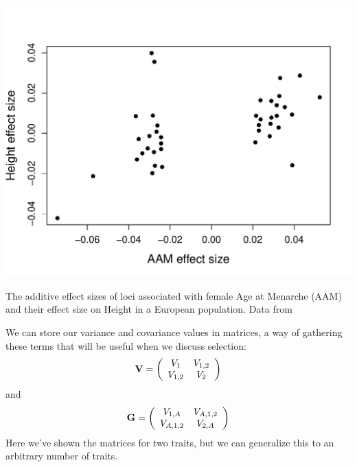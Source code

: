 \begin{marginfigure}
\begin{center}
\includegraphics[width= \textwidth]{Journal_figs/Quant_gen/pickrell_pleiotropy/AAM_height.pdf}
\end{center}
\caption{The additive effect sizes of loci associated with female Age at Menarche (AAM) and their effect size on Height in a European population. Data from \citet{pickrell2016detection}} \label{fig:AAM_height}   %
\end{marginfigure}

We can store our variance and covariance values in matrices, a way of gathering these terms that will be useful when we discuss selection: 
\begin{equation}
\bf{V}= \left( \begin{array}{cc} 
V_{1} & V_{1,2} \\
V_{1,2} & V_{2} \\
\end{array} \right) \label{P_matrix}
\end{equation}
and
\begin{equation}
\bf{G}= \left( \begin{array}{cc} 
V_{1,A} & V_{A,1,2} \\
V_{A,1,2} & V_{2,A} \\
\end{array} \right)  \label{G_matrix}
\end{equation}
Here we've shown the matrices for two traits, but we can generalize this to an arbitrary number of traits.

